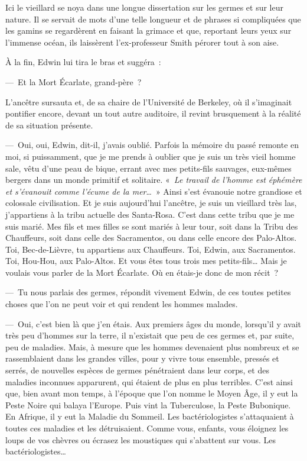 \documentclass[french,twoside]{book} %
\begin{document}
Ici le vieillard se noya dans une longue dissertation sur les germes et sur leur nature. Il se servait de mots d’une telle longueur et de phrases si compliquées que les gamins se regardèrent en faisant la grimace et que, reportant leurs yeux sur l’immense océan, ils laissèrent l’ex-professeur Smith pérorer tout à son aise.\par
À la fin, Edwin lui tira le bras et suggéra :\par
— Et la Mort Écarlate, grand-père ?\par
L’ancêtre sursauta et, de sa chaire de l’Université de Berkeley, où il s’imaginait pontifier encore, devant un tout autre auditoire, il revint brusquement à la réalité de sa situation présente.\par
— Oui, oui, Edwin, dit-il, j’avais oublié. Parfois la mémoire du passé remonte en moi, si puissamment, que je me prends à oublier que je suis un très vieil homme sale, vêtu d’une peau de bique, errant avec mes petits-fils sauvages, eux-mêmes bergers dans un monde primitif et solitaire. « \emph{Le travail de l’homme est éphémère et s’évanouit comme l’écume de la mer}… » Ainsi s’est évanouie notre grandiose et colossale civilisation. Et je suis aujourd’hui l’ancêtre, je suis un vieillard très las, j’appartiens à la tribu actuelle des Santa-Rosa. C’est dans cette tribu que je me suis marié. Mes fils et mes filles se sont mariés à leur tour, soit dans la Tribu des Chauffeurs, soit dans celle des Sacramentos, ou dans celle encore des Palo-Altos. Toi, Bec-de-Lièvre, tu appartiens aux Chauffeurs. Toi, Edwin, aux Sacramentos. Toi, Hou-Hou, aux Palo-Altos. Et vous êtes tous trois mes petits-fils… Mais je voulais vous parler de la Mort Écarlate. Où en étais-je donc de mon récit ?\par
— Tu nous parlais des germes, répondit vivement Edwin, de ces toutes petites choses que l’on ne peut voir et qui rendent les hommes malades.\par
— Oui, c’est bien là que j’en étais. Aux premiers âges du monde, lorsqu’il y avait très peu d’hommes sur la terre, il n’existait que peu de ces germes et, par suite, peu de maladies. Mais, à mesure que les hommes devenaient plus nombreux et se rassemblaient dans les grandes villes, pour y vivre tous ensemble, pressés et serrés, de nouvelles espèces de germes pénétraient dans leur corps, et des maladies inconnues apparurent, qui étaient de plus en plus terribles. C’est ainsi que, bien avant mon temps, à l’époque que l’on nomme le Moyen Âge, il y eut la Peste Noire qui balaya l’Europe. Puis vint la Tuberculose, la Peste Bubonique. En Afrique, il y eut la Maladie du Sommeil. Les bactériologistes s’attaquaient à toutes ces maladies et les détruisaient. Comme vous, enfants, vous éloignez les loups de vos chèvres ou écrasez les moustiques qui s’abattent sur vous. Les bactériologistes…\par
\end{document}
